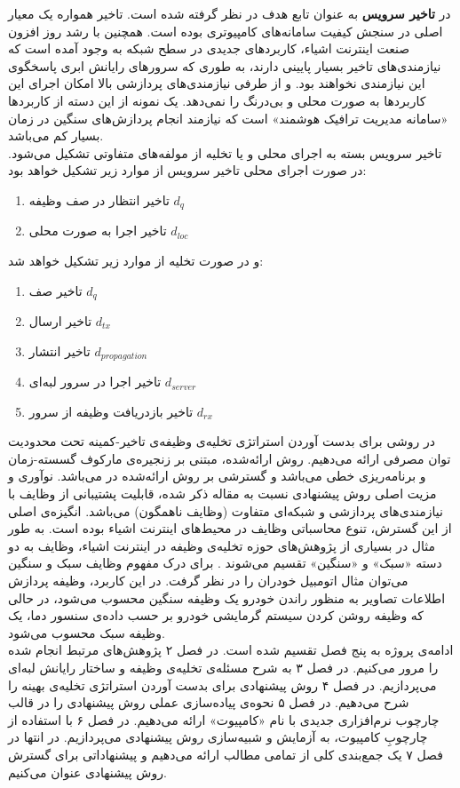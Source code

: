 در \CurrentProject \textbf{تاخیر سرویس} به عنوان تابع هدف در نظر گرفته شده است. تاخیر همواره یک معیار اصلی در سنجش کیفیت سامانه‌های کامپیوتری بوده است. همچنین با رشد روز افزون صنعت اینترنت اشیاء، کاربردهای جدیدی در سطح شبکه به وجود آمده است که نیازمندی‌های تاخیر بسیار پایینی دارند، به طوری که سرورهای رایانش ابری پاسخگوی این نیازمندی نخواهند بود. و از طرفی نیازمندی‌های پردازشی بالا امکان اجرای این کاربردها به صورت محلی و بی‌درنگ را نمی‌دهد. یک نمونه از این دسته از کاربردها «سامانه مدیریت ترافیک هوشمند» است که نیازمند انجام پردازش‌های سنگین در زمان بسیار کم می‌باشد. \\

تاخیر سرویس بسته به اجرای محلی و یا تخلیه از مولفه‌های متفاوتی تشکیل می‌شود. در صورت اجرای محلی تاخیر سرویس از موارد زیر تشکیل خواهد بود:
\begin{enumerate}
	\item تاخیر انتظار در صف وظیفه $d_q$
	\item تاخیر اجرا به صورت محلی $d_{l o c}$
\end{enumerate}
و در صورت تخلیه از موارد زیر تشکیل خواهد شد:
\begin{enumerate}
	\item تاخیر صف $d_q$
	\item تاخیر ارسال $d_{t x}$
	\item تاخیر انتشار $d_{p r o p a g a t i o n}$
	\item تاخیر اجرا در سرور لبه‌ای $d_{s e r v e r}$
	\item تاخیر بازدریافت وظیفه از سرور $d_{r x}$
\end{enumerate}
در \CurrentProject روشی برای بدست آوردن استراتژی تخلیه‌ی وظیفه‌ی تاخیر-کمینه تحت محدودیت توان مصرفی ارائه می‌دهیم. روش ارائه‌شده، مبتنی بر زنجیره‌ی مارکوف گسسته-زمان و برنامه‌ریزی خطی می‌باشد و گسترشی بر روش ارائه‌شده در \Cite{Liu} می‌باشد. نوآوری و مزیت اصلی روش پیشنهادی نسبت به مقاله ذکر شده،‌ قابلیت پشتیبانی از وظایف با نیازمندی‌های پردازشی و شبکه‌ای متفاوت (وظایف ناهمگون) می‌باشد. انگیزه‌ی اصلی از این گسترش، تنوع محاسباتی وظایف در محیط‌های اینترنت اشیاء بوده است. به طور مثال در بسیاری از پژوهش‌های حوزه تخلیه‌ی وظیفه در اینترنت اشیاء، وظایف به دو دسته «سبک» و «سنگین» تقسیم می‌شوند \Cite{yousefpour, tran}. برای درک مفهوم وظایف سبک و سنگین می‌توان مثال اتومبیل خودران را در نظر گرفت. در این کاربرد، وظیفه پردازش اطلاعات تصاویر به منظور راندن خودرو یک وظیفه سنگین محسوب می‌شود، در حالی که وظیفه‌ روشن کردن سیستم گرمایشی خودرو بر حسب داده‌ی سنسور دما، یک وظیفه سبک محسوب می‌شود. \\

ادامه‌ی پروژه به پنج فصل تقسیم شده است. در فصل ۲ پژوهش‌های مرتبط انجام شده را مرور می‌کنیم. در فصل ۳ به شرح مسئله‌ی تخلیه‌ی وظیفه و ساختار رایانش لبه‌ای می‌پردازیم. در فصل ۴ روش پیشنهادی برای بدست آوردن استراتژی تخلیه‌ی بهینه را شرح می‌دهیم. در فصل ۵ نحوه‌ی پیاده‌سازی عملی روش پیشنهادی را در قالب چارچوب نرم‌افزاری جدیدی با نام «کامپیوت» ارائه می‌دهیم. در فصل ۶ با استفاده از چارچوبِ کامپیوت، به آزمایش و شبیه‌سازی روش پیشنهادی می‌پردازیم. در انتها در فصل ۷ یک جمع‌بندی کلی از تمامی مطالب ارائه می‌دهیم و پیشنهاداتی برای گسترش روش پیشنهادی عنوان می‌کنیم.
\clearpage
